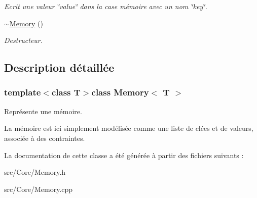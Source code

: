 \begin{DoxyCompactItemize}
\begin{DoxyCompactList}\small\item\em Ecrit une valeur \char`\"{}value\char`\"{} dans la case mémoire avec un nom \char`\"{}key\char`\"{}. \end{DoxyCompactList}\item 
\hypertarget{classMemory_a2d153fdede89954dc0875ab6c8d804c3}{\hyperlink{classMemory_a2d153fdede89954dc0875ab6c8d804c3}{$\sim$\-Memory} ()}\label{classMemory_a2d153fdede89954dc0875ab6c8d804c3}

\begin{DoxyCompactList}\small\item\em Destructeur. \end{DoxyCompactList}\end{DoxyCompactItemize}


\subsection{Description détaillée}
\subsubsection*{template$<$class T$>$class Memory$<$ T $>$}

Représente une mémoire. 

La mémoire est ici simplement modélisée comme une liste de clées et de valeurs, associée à des contraintes. 

La documentation de cette classe a été générée à partir des fichiers suivants \-:\begin{DoxyCompactItemize}
\item 
src/\-Core/Memory.\-h\item 
src/\-Core/Memory.\-cpp\end{DoxyCompactItemize}
